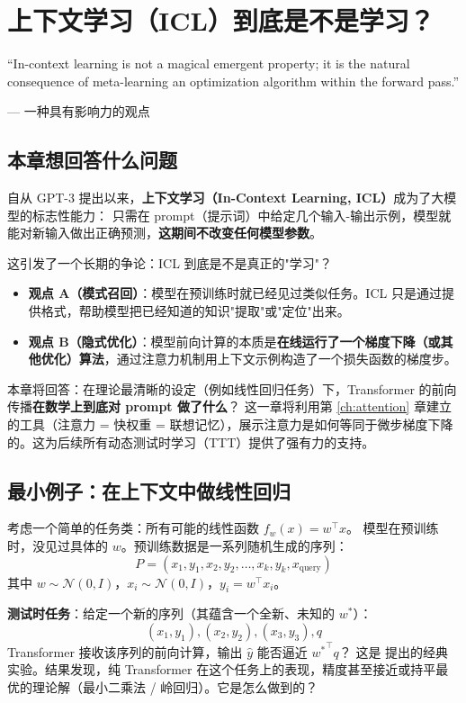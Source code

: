 \chapter{上下文学习（ICL）到底是不是学习？}
\label{ch:icl}

\epigraph{``In-context learning is not a magical emergent property; it is the natural consequence of meta-learning an optimization algorithm within the forward pass.''}{--- 一种具有影响力的观点}

\section{本章想回答什么问题}

自从 GPT-3 提出以来，\textbf{上下文学习（In-Context Learning, ICL）}成为了大模型的标志性能力：
只需在 prompt（提示词）中给定几个输入-输出示例，模型就能对新输入做出正确预测，\textbf{这期间不改变任何模型参数}。

这引发了一个长期的争论：ICL 到底是不是真正的"学习"？
\begin{itemize}
  \item \textbf{观点 A（模式召回）}：模型在预训练时就已经见过类似任务。ICL 只是通过提供格式，帮助模型把已经知道的知识"提取"或"定位"出来。
  \item \textbf{观点 B（隐式优化）}：模型前向计算的本质是\textbf{在线运行了一个梯度下降（或其他优化）算法}，通过注意力机制用上下文示例构造了一个损失函数的梯度步。
\end{itemize}

本章将回答：在理论最清晰的设定（例如线性回归任务）下，Transformer 的前向传播\textbf{在数学上到底对 prompt 做了什么}？
这一章将利用第 \ref{ch:attention} 章建立的工具（注意力 = 快权重 = 联想记忆），展示注意力是如何等同于微步梯度下降的。这为后续所有动态测试时学习（TTT）提供了强有力的支持。

\section{最小例子：在上下文中做线性回归}
\label{sec:icl_minimal}

\begin{toybox}[title=玩具问题 C：ICL 处理线性函数]
考虑一个简单的任务类：所有可能的线性函数 $f_w(x) = w^\top x$。
模型在预训练时，没见过具体的 $w$。预训练数据是一系列随机生成的序列：
\[
  P = (x_1, y_1, x_2, y_2, \ldots, x_k, y_k, x_\text{query})
\]
其中 $w \sim \mathcal{N}(0, I)$，$x_i \sim \mathcal{N}(0, I)$，$y_i = w^\top x_i$。

\textbf{测试时任务}：给定一个新的序列（其蕴含一个全新、未知的 $w^*$）：
\[
  (x_1, y_1), (x_2, y_2), (x_3, y_3), q
\]
Transformer 接收该序列的前向计算，输出 $\hat{y}$ 能否逼近 ${w^*}^\top q$？
这是 \citet{garg2022what} 提出的经典实验。结果发现，纯 Transformer 在这个任务上的表现，精度甚至接近或持平最优的理论解（最小二乘法 / 岭回归）。它是怎么做到的？
\end{toybox}

